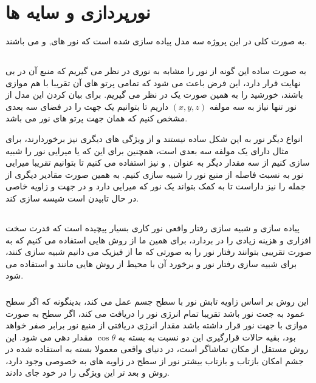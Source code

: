 \documentclass[a4paper, 12pt]{book}
\begin{document}
\newpage
{}
\section*{\huge{نورپردازی و سایه ها}}
\vspace*{0.6cm}
\noindent
\normalsize

    به صورت کلی در این پروژه سه مدل پیاده سازی شده است که  نور های,  و  می باشند. 
\subsection*{}
    به صورت ساده این گونه از نور را مشابه به نوری در نظر می گیریم که منبع آن در بی نهایت قرار دارد، این فرض باعث می شود که تمامی پرتو های آن تقریبا با هم موازی باشند، خورشید را به همین صورت یک  در نظر می گیریم. برای بیان کردن این مدل از نور تنها نیاز به سه مولفه 
    $(x, y, z)$
    داریم تا بتوانیم یک جهت را در فضای سه بعدی مشخص کنیم که همان جهت پرتو های نور می باشد.\par
    انواع دیگر نور به این شکل ساده نیستند و از ویژگی های دیگری نیز برخوردارند، برای مثال  دارای یک مولفه سه بعدی  است، همچنین برای این که  یا میرایی نور را شبیه سازی کنیم از سه مقدار دیگر به عنوان ,  و  نیز استفاده می کنیم تا بتوانیم تقریبا میرایی نور به نسبت فاصله از منبع نور را شبیه سازی کنیم. به همین صورت مقادیر دیگری از جمله  را نیز داراست تا به کمک  بتواند یک نور که میرایی دارد و در جهت و زاویه خاصی در حال تابیدن است شیسه سازی کند.
    
\subsection*{}
    پیاده سازی و شبیه سازی رفتار واقعی نور کاری بسیار پیچیده است که قدرت سخت افزاری و هزینه زیادی را در بردارد، برای همین ما از روش هایی استفاده می کنیم که به صورت تقریبی بتوانند رفتار نور را به صورتی که ما از فیزیک می دانیم شبیه سازی کنند، برای شبیه سازی رفتار نور و برخورد آن با محیط از روش هایی مانند  و  استفاده می شود.
    
    \subsubsection*{}
        این روش بر اساس زاویه تابش نور با سطح جسم عمل می کند، بدینگونه که اگر سطح عمود به جعت نور باشد تقریبا تمام انرژی نور را دریافت می کند، اگر سطح به صورت موازی با جهت نور قرار داشته باشد مقدار انرژی دریافتی از منبع نور برابر صفر خواهد بود، بقیه حالات قرارگیری این دو نسبت به بسته به 
        $\cos \theta$
        مقدار دهی می شود. این روش مستقل از مکان تماشاگر است، در دنیای واقعی معمولا بسته به  استفاده شده در جشم امکان بازتاب و بازتاب بیشتر نور از سطح در زاویه های به خصوصی وجود دارد، روش  و بعد تر  این ویژگی را در خود جای دادند.
    
\end{document}

